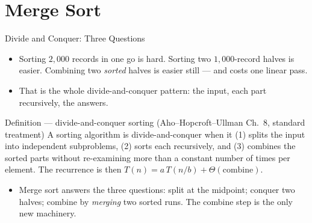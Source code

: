 \documentclass[aspectratio=169]{beamer}
\begin{document}

\section{Merge Sort}


\begin{frame}{Divide and Conquer: Three Questions}
  \begin{itemize}
    \item Sorting $2{,}000$ records in one go is hard. Sorting two
      $1{,}000$-record halves is easier. Combining two \emph{sorted} halves
      is easier still --- and costs one linear pass.
    \item That is the whole divide-and-conquer pattern:  the
      input,  each part recursively,  the answers.
  \end{itemize}
  \begin{block}{Definition --- divide-and-conquer sorting
    (Aho--Hopcroft--Ullman Ch.~8, standard treatment)}
    A sorting algorithm is divide-and-conquer when it (1) splits the input
    into independent subproblems, (2) sorts each recursively, and (3)
    combines the sorted parts without re-examining more than a constant
    number of times per element. The recurrence is then
    $T(n) = a\,T(n/b) + \Theta(\text{combine})$.
  \end{block}
  \begin{itemize}
    \item Merge sort answers the three questions: split at the midpoint;
      conquer two halves; combine by \emph{merging} two sorted runs. The
      combine step is the only new machinery.
  \end{itemize}
\end{frame}
\end{document}
